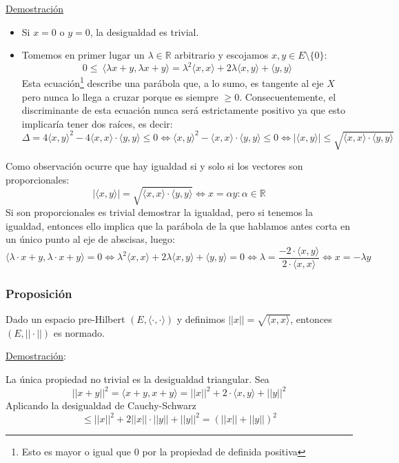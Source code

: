 \documentclass[10pt,a4paper,openright]{book}
\theoremstyle{break}
\begin{document}
\underline{Demostración}
\begin{itemize}
\item Si $x = 0$ o $y=0$, la desigualdad es trivial.

\item Tomemos en primer lugar un $\lambda\in \mathbb R$ arbitrario y escojamos $x,y \in E \setminus \{0\}$:
$$0 \leq \ \langle \lambda x + y, \lambda x + y\rangle = \lambda^2 \langle x,x\rangle + 2\lambda \langle x,y\rangle + \langle y,y\rangle$$
Esta ecuación\footnote{Esto es mayor o igual que 0 por la propiedad de definida positiva} describe una parábola que, a lo sumo, es tangente al eje $X$ pero nunca lo llega a cruzar porque es siempre $\geq 0$. Consecuentemente, el discriminante de esta ecuación nunca será estrictamente positivo ya que esto implicaría tener dos raíces, es decir:
$$\Delta = 4 \langle x,y\rangle^2 - 4\langle x,x\rangle\cdot \langle y,y\rangle \leq 0 \Leftrightarrow \langle x,y\rangle^2 -\langle x,x\rangle\cdot \langle y,y\rangle \leq 0 \Leftrightarrow|\langle x,y\rangle| \leq \sqrt{\langle x,x\rangle\cdot\langle y,y\rangle}$$
\end{itemize}
Como observación ocurre que hay igualdad si y solo si los vectores son proporcionales:
$$|\langle x,y\rangle| =\sqrt{\langle x,x\rangle \cdot \langle y,y\rangle} \Leftrightarrow x = \alpha y : \alpha \in \mathbb{R}$$
Si son proporcionales es trivial demostrar la igualdad, pero si tenemos la igualdad, entonces ello implica que la parábola de la que hablamos antes corta en un único punto al eje de abscisas, luego:
$$\langle\lambda \cdot x + y, \lambda \cdot x + y\rangle =  0\Leftrightarrow  \lambda^2 \langle x,x\rangle + 2\lambda \langle x,y\rangle + \langle y,y\rangle = 0 \Leftrightarrow \lambda = \frac{-2 \cdot \langle x,y\rangle}{2 \cdot \langle x,x\rangle} \Leftrightarrow x = -\lambda y$$

\subsubsection*{Proposición}
Dado un espacio pre-Hilbert $(E, \langle \cdot, \cdot \rangle)$ y definimos $||x|| = \sqrt{\langle x,x \rangle}$, entonces $(E, || \cdot ||)$ es normado.

\underline{Demostración}:

La única propiedad no trivial es la desigualdad triangular. Sea 
$$|| x+y||^2 = \langle x+y,x+y\rangle = ||x||^2 + 2 \cdot \langle x,y\rangle + ||y||^2$$
Aplicando la desigualdad de Cauchy-Schwarz
$$\leq ||x||^2 + 2 ||x|| \cdot ||y|| + ||y||^2 = (||x|| + ||y||)^2$$
\end{document}
